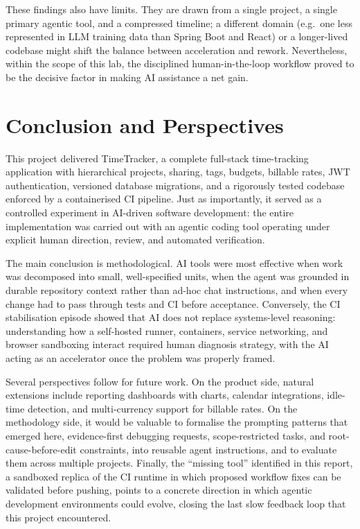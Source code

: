 \documentclass[11pt,a4paper]{article}
\begin{document}
These findings also have limits. They are drawn from a single project, a single primary agentic tool, and a compressed timeline; a different domain (e.g.\ one less represented in LLM training data than Spring Boot and React) or a longer-lived codebase might shift the balance between acceleration and rework. Nevertheless, within the scope of this lab, the disciplined human-in-the-loop workflow proved to be the decisive factor in making AI assistance a net gain.

\newpage
\section{Conclusion and Perspectives}

This project delivered TimeTracker, a complete full-stack time-tracking application with hierarchical projects, sharing, tags, budgets, billable rates, JWT authentication, versioned database migrations, and a rigorously tested codebase enforced by a containerised CI pipeline. Just as importantly, it served as a controlled experiment in AI-driven software development: the entire implementation was carried out with an agentic coding tool operating under explicit human direction, review, and automated verification.

The main conclusion is methodological. AI tools were most effective when work was decomposed into small, well-specified units, when the agent was grounded in durable repository context rather than ad-hoc chat instructions, and when every change had to pass through tests and CI before acceptance. Conversely, the CI stabilisation episode showed that AI does not replace systems-level reasoning: understanding how a self-hosted runner, containers, service networking, and browser sandboxing interact required human diagnosis strategy, with the AI acting as an accelerator once the problem was properly framed.

Several perspectives follow for future work. On the product side, natural extensions include reporting dashboards with charts, calendar integrations, idle-time detection, and multi-currency support for billable rates. On the methodology side, it would be valuable to formalise the prompting patterns that emerged here, evidence-first debugging requests, scope-restricted tasks, and root-cause-before-edit constraints, into reusable agent instructions, and to evaluate them across multiple projects. Finally, the ``missing tool'' identified in this report, a sandboxed replica of the CI runtime in which proposed workflow fixes can be validated before pushing, points to a concrete direction in which agentic development environments could evolve, closing the last slow feedback loop that this project encountered.
\end{document}
